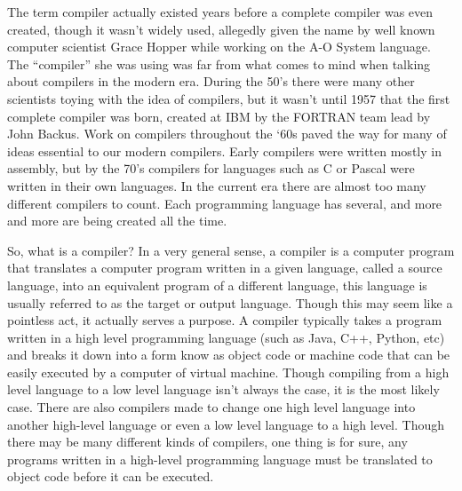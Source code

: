 \documentclass[12pt, oneside]{article}   	%
\begin{document}
The term compiler actually existed years before a complete compiler was
even created, though it wasn’t widely used, allegedly given the name by well
known computer scientist Grace Hopper while working on the A-O System
language. The “compiler” she was using was far from what comes to mind when
talking about compilers in the modern era. During the 50’s there were many other
scientists toying with the idea of compilers, but it wasn’t until 1957 that the first
complete compiler was born, created at IBM by the FORTRAN team lead by
John Backus. Work on compilers throughout the ‘60s paved the way for many of
ideas essential to our modern compilers. Early compilers were written mostly in
assembly, but by the 70’s compilers for languages such as C or Pascal were
written in their own languages. In the current era there are almost too many
different compilers to count. Each programming language has several, and more
and more are being created all the time.\cite{history}

So, what is a compiler? In a very general sense, a compiler is a computer
program that translates a computer program written in a given language, called a
source language, into an equivalent program of a different language, this
language is usually referred to as the target or output language. Though this may
seem like a pointless act, it actually serves a purpose. A compiler typically takes
a program written in a high level programming language (such as Java, C++,
Python, etc) and breaks it down into a form know as object code or machine code
that can be easily executed by a computer of virtual machine. Though compiling
from a high level language to a low level language isn’t always the case, it is
the most likely case. There are also compilers made to change one high level
language into another high-level language or even a low level language to a high
level. Though there may be many different kinds of compilers, one thing is for
sure, any programs written in a high-level programming language must be
translated to object code before it can be executed.
\end{document}
